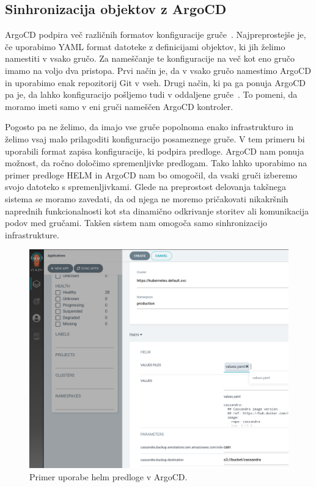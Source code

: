 \documentclass[a4paper, 12pt]{book}
\begin{document}
\subsection{Sinhronizacija objektov z ArgoCD}
ArgoCD podpira več različnih formatov konfiguracije gruče~\cite{argocd-docs}.
Najpreprostejše je, če uporabimo YAML format datoteke z definicijami objektov, ki jih želimo namestiti v vsako gručo.
Za nameščanje te konfiguracije na več kot eno gručo imamo na voljo dva pristopa.
Prvi način je, da v vsako gručo namestimo ArgoCD in uporabimo enak repozitorij Git v vseh.
Drugi način, ki pa ga ponuja ArgoCD pa je, da lahko konfiguracijo pošljemo tudi v oddaljene gruče~\cite{declarative-setup}. To pomeni, da moramo imeti samo v eni gruči nameščen ArgoCD kontroler.

Pogosto pa ne želimo, da imajo vse gruče popolnoma enako infrastrukturo in želimo vsaj malo prilagoditi konfiguracijo posameznege gruče.
V tem primeru bi uporabili format zapisa konfiguracije, ki podpira predloge.
ArgoCD nam ponuja možnost, da ročno določimo spremenljivke predlogam.
Tako lahko uporabimo na primer predloge HELM in ArgoCD nam bo omogočil, da vsaki gruči izberemo svojo datoteko s spremenljivkami.
Glede na preprostost delovanja takšnega sistema se moramo zavedati, da od njega ne moremo pričakovati nikakršnih naprednih funkcionalnosti kot sta dinamično odkrivanje storitev ali komunikacija podov med gručami.
Takšen sistem nam omogoča samo sinhronizacijo infrastrukture.

\begin{figure}[h]
\begin{center}
\includegraphics[width=1.0\textwidth]{images/primer-uporabe-helm-predloge-argo-cd.png}
\end{center}
\caption{Primer uporabe helm predloge v ArgoCD.}
\label{primer-uporabe-helm-predloge-argo-cd}
\end{figure}
\end{document}
